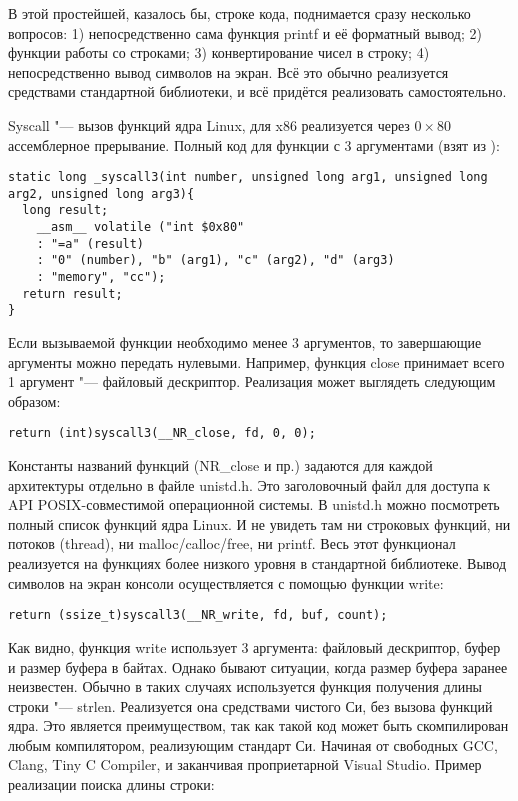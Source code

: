 \documentclass[10pt, a5paper]{article}
\begin{document}
В этой простейшей, казалось бы, строке кода, поднимается сразу несколько вопросов: 1) непосредственно сама функция printf и её форматный вывод; 2) функции работы со строками; 3) конвертирование чисел в строку; 4) непосредственно вывод символов на экран. Всё это обычно реализуется средствами стандартной библиотеки, и всё придётся реализовать самостоятельно.

Syscall "--- вызов функций ядра Linux, для x86 реализуется через $0\times80$ ассемблерное прерывание. Полный код для функции с 3 аргументами (взят из \footnotemark[4]):

\begin{lstlisting}
static long _syscall3(int number, unsigned long arg1, unsigned long arg2, unsigned long arg3){
  long result;
    __asm__ volatile ("int $0x80"
    : "=a" (result)
    : "0" (number), "b" (arg1), "c" (arg2), "d" (arg3)
    : "memory", "cc");
  return result;
}
\end{lstlisting}

Если вызываемой функции необходимо менее 3 аргументов, то завершающие аргументы можно передать нулевыми. Например, \linebreak функция close принимает всего 1 аргумент "--- файловый дескриптор. Реализация может выглядеть следующим образом:

\begin{lstlisting}
return (int)syscall3(__NR_close, fd, 0, 0);
\end{lstlisting}

Константы названий функций (NR\_close и пр.) задаются для каждой архитектуры отдельно в файле unistd.h. Это заголовочный файл для доступа к API POSIX-совместимой операционной системы. В unistd.h можно посмотреть полный список функций ядра Linux. И не увидеть там ни строковых функций, ни потоков (thread), ни malloc/calloc/free, ни printf. Весь этот функционал реализуется на функциях более низкого уровня в стандартной библиотеке. Вывод символов на экран консоли осуществляется с помощью функции write:

\begin{lstlisting}
return (ssize_t)syscall3(__NR_write, fd, buf, count);
\end{lstlisting}

Как видно, функция write использует 3 аргумента: файловый дескриптор, буфер и размер буфера в байтах. Однако бывают ситуации, когда размер буфера заранее неизвестен. Обычно в таких случаях используется функция получения длины строки "--- strlen. Реализуется она средствами чистого Си, без вызова функций ядра. Это является преимуществом, так как такой код может быть скомпилирован любым компилятором, реализующим стандарт Си. Начиная от свободных GCC, Clang, Tiny C Compiler, и заканчивая проприетарной Visual Studio. Пример реализации поиска длины строки:
\end{document}

